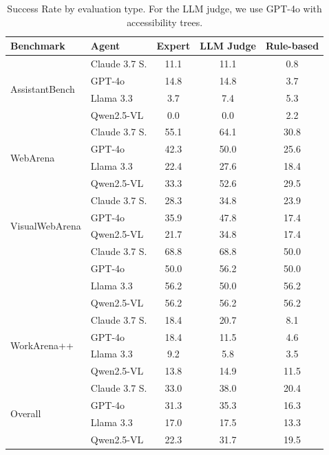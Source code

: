 \documentclass{article} %
\newcommand{\fourrows}[1]{\multirow{4}{*}{#1}}
\begin{document}
\begin{table}[t]
    \centering
    \small
    
\begin{tabular}{ll @{\hskip 25pt} c @{\hskip 25pt} c @{\hskip 25pt} c}
\toprule
Benchmark & Agent & Expert & LLM Judge & Rule-based \\
\midrule
\fourrows{AssistantBench} & Claude 3.7 S. & 11.1 & 11.1 & 0.8 \\
               & GPT-4o & 14.8 & 14.8 & 3.7 \\
               & Llama 3.3 & 3.7 & 7.4 & 5.3 \\
               & Qwen2.5-VL & 0.0 & 0.0 & 2.2 \\
\midrule
\fourrows{WebArena} & Claude 3.7 S. & 55.1 & 64.1 & 30.8 \\
         & GPT-4o & 42.3 & 50.0 & 25.6 \\
         & Llama 3.3 & 22.4 & 27.6 & 18.4 \\
         & Qwen2.5-VL & 33.3 & 52.6 & 29.5 \\
\midrule
\fourrows{VisualWebArena} & Claude 3.7 S. & 28.3 & 34.8 & 23.9 \\
               & GPT-4o & 35.9 & 47.8 & 17.4 \\
               & Qwen2.5-VL & 21.7 & 34.8 & 17.4 \\
\midrule
\fourrows{WorkArena} & Claude 3.7 S. & 68.8 & 68.8 & 50.0 \\
          & GPT-4o & 50.0 & 56.2 & 50.0 \\
          & Llama 3.3 & 56.2 & 50.0 & 56.2 \\
          & Qwen2.5-VL & 56.2 & 56.2 & 56.2 \\
\midrule
\fourrows{WorkArena++} & Claude 3.7 S. & 18.4 & 20.7 & 8.1 \\
            & GPT-4o & 18.4 & 11.5 & 4.6 \\
            & Llama 3.3 & 9.2 & 5.8 & 3.5 \\
            & Qwen2.5-VL & 13.8 & 14.9 & 11.5 \\
\midrule
\fourrows{Overall} & Claude 3.7 S. & 33.0 & 38.0 & 20.4 \\
        & GPT-4o & 31.3 & 35.3 & 16.3 \\
        & Llama 3.3 & 17.0 & 17.5 & 13.3 \\
        & Qwen2.5-VL & 22.3 & 31.7 & 19.5 \\
\bottomrule
\end{tabular}

    \caption{\small Success Rate by evaluation type. For the LLM judge, we use GPT-4o with accessibility trees.}
    \label{tab:appendix_success_rate_by_judge}
\end{table}
\end{document}
